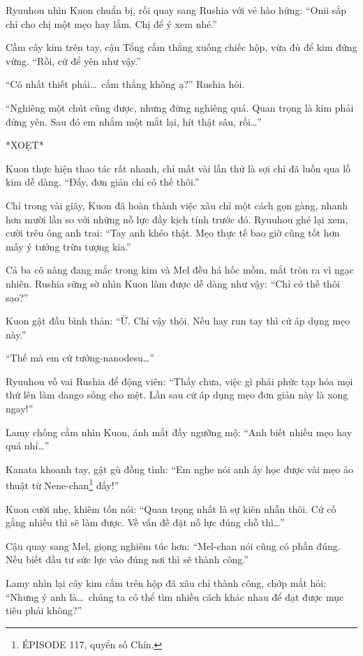 \documentclass[../main.tex]{subfiles}
\begin{document}
Ryuuhou nhìn Kuon chuẩn bị, rồi quay sang Rushia với vẻ hào hứng: ``Onii sắp chỉ cho chị một mẹo hay lắm. Chị để ý xem nhé.''

Cầm cây kim trên tay, cậu Tổng cắm thẳng xuống chiếc hộp, vừa đủ để kim đứng vững. ``Rồi, cứ để yên như vậy.''

``Có nhất thiết phải\dots\ cắm thẳng không ạ?'' Rushia hỏi.

``Nghiêng một chút cũng được, nhưng đừng nghiêng quá. Quan trọng là kim phải đứng yên. Sau đó em nhắm một mắt lại, hít thật sâu, rồi\dots''

*XOẸT*

Kuon thực hiện thao tác rất nhanh, chỉ mất vài lần thử là sợi chỉ đã luồn qua lỗ kim dễ dàng. ``Đấy, đơn giản chỉ có thế thôi.''

Chỉ trong vài giây, Kuon đã hoàn thành việc xâu chỉ một cách gọn gàng, nhanh hơn mười lần so với những nỗ lực đầy kịch tính trước đó.
Ryuuhou ghé lại xem, cười trêu ông anh trai: ``Tay anh khéo thật. Mẹo thực tế bao giờ cũng tốt hơn mấy ý tưởng trừu tượng kia.''

Cả ba cô nàng đang mắc trong kim và Mel đều há hốc mồm, mắt tròn ra vì ngạc nhiên. Rushia sững sờ nhìn Kuon làm được dễ dàng như vậy: ``Chỉ có thế thôi sao?''

Kuon gật đầu bình thản: ``Ừ. Chỉ vậy thôi. Nếu hay run tay thì cứ áp dụng mẹo này.''

``Thế mà em cứ tưởng-nanodesu\dots''

Ryuuhou vỗ vai Rushia để động viên: ``Thấy chưa, việc gì phải phức tạp hóa mọi thứ lên làm dango sống cho mệt. Lần sau cứ áp dụng mẹo đơn giản này là xong ngay!''

Lamy chống cằm nhìn Kuon, ánh mắt đầy ngưỡng mộ: ``Anh biết nhiều mẹo hay quá nhỉ\dots''

Kanata khoanh tay, gật gù đồng tình: ``Em nghe nói anh ấy học được vài mẹo ảo thuật từ Nene-chan\footnote{{\flaregothic ÉPISODE 117}, quyển số Chín.} đấy!''

Kuon cười nhẹ, khiêm tốn nói: ``Quan trọng nhất là sự kiên nhẫn thôi. Cứ cố gắng nhiều thì sẽ làm được. Về vấn đề đặt nỗ lực đúng chỗ thì\dots''

Cậu quay sang Mel, giọng nghiêm túc hơn: ``Mel-chan nói cũng có phần đúng. Nếu biết đầu tư sức lực vào đúng nơi thì sẽ thành công.''

Lamy nhìn lại cây kim cắm trên hộp đã xâu chỉ thành công, chớp mắt hỏi: ``Nhưng ý anh là\dots\ chúng ta có thể tìm nhiều cách khác nhau để đạt được mục tiêu phải không?''
\end{document}
